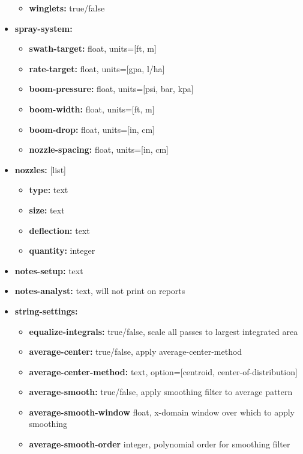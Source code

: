 \documentclass[10pt,letterpaper,titlepage]{article}
\begin{document}
\begin{itemize}
\begin{itemize}
            \item \textbf{winglets:} true/false
        \end{itemize}
        \item \textbf{spray-system:} 
        \begin{itemize}
            \item \textbf{swath-target:} float, units=[ft, m]
            \item \textbf{rate-target:} float, units=[gpa, l/ha]
            \item \textbf{boom-pressure:} float, units=[psi, bar, kpa]
            \item \textbf{boom-width:} float, units=[ft, m]
            \item \textbf{boom-drop:} float, units=[in, cm]
            \item \textbf{nozzle-spacing:} float, units=[in, cm]
        \end{itemize}
        \item \textbf{nozzles:} [list]
        \begin{itemize}
            \item \textbf{type:} text
            \item \textbf{size:} text
            \item \textbf{deflection:} text
            \item \textbf{quantity:} integer
        \end{itemize}
        \item \textbf{notes-setup:} text
        \item \textbf{notes-analyst:} text, will not print on reports
        \item \textbf{string-settings:} 
        \begin{itemize}
            \item \textbf{equalize-integrals:} true/false, scale all passes to largest integrated area
            \item \textbf{average-center:} true/false, apply average-center-method
            \item \textbf{average-center-method:} text, option=[centroid, center-of-distribution]
            \item \textbf{average-smooth:} true/false, apply smoothing filter to average pattern
            \item \textbf{average-smooth-window} float, x-domain window over which to apply smoothing
            \item \textbf{average-smooth-order} integer, polynomial order for smoothing filter

\end{itemize}
\end{itemize}
\end{document}
